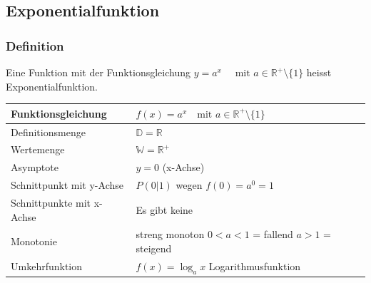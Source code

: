 \begin{multicols}{2}
    \subsection{Exponentialfunktion}
    \vspace{-4mm}
    \subsubsection{Definition}
    \vspace{-4mm}
    Eine Funktion mit der Funktionsgleichung $y = a^x \quad \text{ mit } a \in \mathbb{R}^{+}\setminus\{1\}$ heisst Exponentialfunktion.

    \begin{tabularx}{0.5\textwidth} {
            | >{\raggedright\arraybackslash}X
            | >{\raggedright\arraybackslash}X |}
        \hline
        Funktionsgleichung        & $f(x) = a^x \quad \text{mit } a \in \mathbb{R}^{+}\setminus\{1\}$ \\ \hline
        Definitionsmenge          & $\mathbb{D} = \mathbb{R}$                                         \\ \hline
        Wertemenge                & $\mathbb{W} = \mathbb{R}^{+}$                                     \\ \hline
        Asymptote                 & $y = 0$ (x-Achse)                                                 \\ \hline
        Schnittpunkt mit y-Achse  & $P(0|1)$ wegen $f(0) = a^0 = 1$                                   \\ \hline
        Schnittpunkte mit x-Achse & Es gibt keine                                                     \\ \hline
        Monotonie                 & streng monoton $0 < a < 1$  = fallend $a > 1$ = steigend          \\ \hline
        Umkehrfunktion            & $f(x) = \log_{a}x$ Logarithmusfunktion                            \\ \hline
    \end{tabularx}



\end{multicols}
